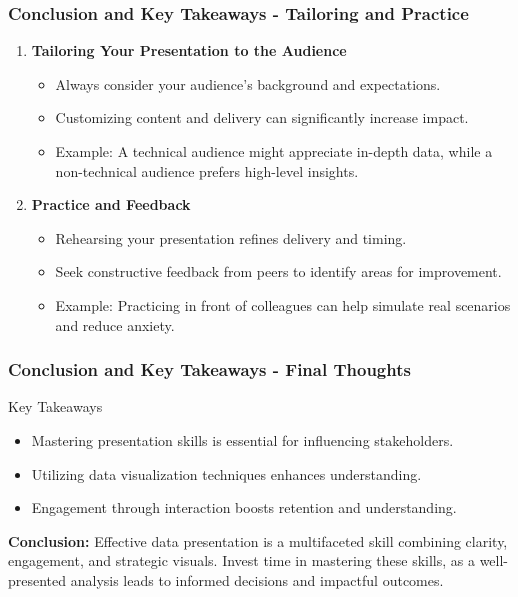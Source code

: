 \documentclass[aspectratio=169]{beamer}
\begin{document}
\begin{frame}[fragile]
    \frametitle{Conclusion and Key Takeaways - Tailoring and Practice}
    \begin{enumerate}[resume]
        \item \textbf{Tailoring Your Presentation to the Audience}
        \begin{itemize}
            \item Always consider your audience's background and expectations.
            \item Customizing content and delivery can significantly increase impact.
            \item Example: A technical audience might appreciate in-depth data, while a non-technical audience prefers high-level insights.
        \end{itemize}
        
        \item \textbf{Practice and Feedback}
        \begin{itemize}
            \item Rehearsing your presentation refines delivery and timing.
            \item Seek constructive feedback from peers to identify areas for improvement.
            \item Example: Practicing in front of colleagues can help simulate real scenarios and reduce anxiety.
        \end{itemize}
    \end{enumerate}
\end{frame}

\begin{frame}[fragile]
    \frametitle{Conclusion and Key Takeaways - Final Thoughts}
    \begin{block}{Key Takeaways}
        \begin{itemize}
            \item Mastering presentation skills is essential for influencing stakeholders.
            \item Utilizing data visualization techniques enhances understanding.
            \item Engagement through interaction boosts retention and understanding.
        \end{itemize}
    \end{block}

    \textbf{Conclusion:} 
    Effective data presentation is a multifaceted skill combining clarity, engagement, and strategic visuals. Invest time in mastering these skills, as a well-presented analysis leads to informed decisions and impactful outcomes.
\end{frame}
\end{document}
